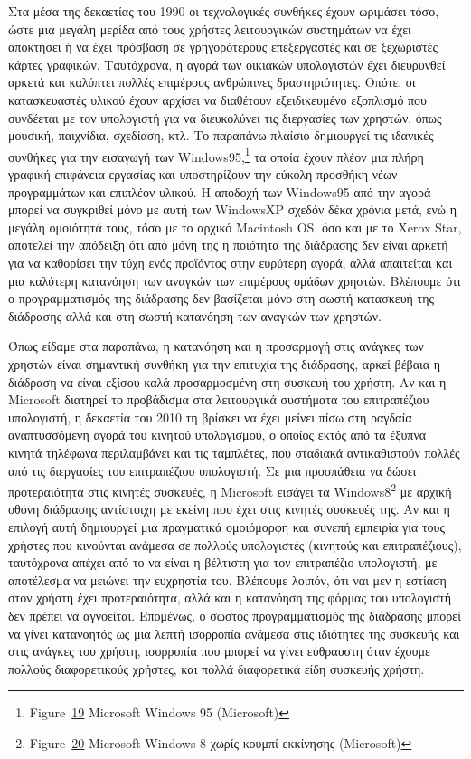 \documentclass[
]{article}
\begin{document}
Στα μέσα της δεκαετίας του 1990 οι τεχνολογικές συνθήκες έχουν ωριμάσει
τόσο, ώστε μια μεγάλη μερίδα από τους χρήστες λειτουργικών συστημάτων να
έχει αποκτήσει ή να έχει πρόσβαση σε γρηγορότερους επεξεργαστές και σε
ξεχωριστές κάρτες γραφικών. Ταυτόχρονα, η αγορά των οικιακών υπολογιστών
έχει διευρυνθεί αρκετά και καλύπτει πολλές επιμέρους ανθρώπινες
δραστηριότητες. Οπότε, οι κατασκευαστές υλικού έχουν αρχίσει να
διαθέτουν εξειδικευμένο εξοπλισμό που συνδέεται με τον υπολογιστή για να
διευκολύνει τις διεργασίες των χρηστών, όπως μουσική, παιχνίδια,
σχεδίαση, κτλ. Το παραπάνω πλαίσιο δημιουργεί τις ιδανικές συνθήκες για
την εισαγωγή των Windows95,\footnote{Figure~\protect\hyperlink{fig:windows95}{19}
  Microsoft Windows 95 (Microsoft)} τα οποία έχουν πλέον μια πλήρη
γραφική επιφάνεια εργασίας και υποστηρίζουν την εύκολη προσθήκη νέων
προγραμμάτων και επιπλέον υλικού. Η αποδοχή των Windows95 από την αγορά
μπορεί να συγκριθεί μόνο με αυτή των WindowsXP σχεδόν δέκα χρόνια μετά,
ενώ η μεγάλη ομοιότητά τους, τόσο με το αρχικό Macintosh OS, όσο και με
το Xerox Star, αποτελεί την απόδειξη ότι από μόνη της η ποιότητα της
διάδρασης δεν είναι αρκετή για να καθορίσει την τύχη ενός προϊόντος στην
ευρύτερη αγορά, αλλά απαιτείται και μια καλύτερη κατανόηση των αναγκών
των επιμέρους ομάδων χρηστών. Βλέπουμε ότι ο προγραμματισμός της
διάδρασης δεν βασίζεται μόνο στη σωστή κατασκευή της διάδρασης αλλά και
στη σωστή κατανόηση των αναγκών των χρηστών.

Όπως είδαμε στα παραπάνω, η κατανόηση και η προσαρμογή στις ανάγκες των
χρηστών είναι σημαντική συνθήκη για την επιτυχία της διάδρασης, αρκεί
βέβαια η διάδραση να είναι εξίσου καλά προσαρμοσμένη στη συσκευή του
χρήστη. Αν και η Microsoft διατηρεί το προβάδισμα στα λειτουργικά
συστήματα του επιτραπέζιου υπολογιστή, η δεκαετία του 2010 τη βρίσκει να
έχει μείνει πίσω στη ραγδαία αναπτυσσόμενη αγορά του κινητού
υπολογισμού, ο οποίος εκτός από τα έξυπνα κινητά τηλέφωνα περιλαμβάνει
και τις ταμπλέτες, που σταδιακά αντικαθιστούν πολλές από τις διεργασίες
του επιτραπέζιου υπολογιστή. Σε μια προσπάθεια να δώσει προτεραιότητα
στις κινητές συσκευές, η Microsoft εισάγει τα Windows8\footnote{Figure~\protect\hyperlink{fig:windows8}{20}
  Microsoft Windows 8 χωρίς κουμπί εκκίνησης (Microsoft)} με αρχική
οθόνη διάδρασης αντίστοιχη με εκείνη που έχει στις κινητές συσκευές της.
Αν και η επιλογή αυτή δημιουργεί μια πραγματικά ομοιόμορφη και συνεπή
εμπειρία για τους χρήστες που κινούνται ανάμεσα σε πολλούς υπολογιστές
(κινητούς και επιτραπέζιους), ταυτόχρονα απέχει από το να είναι η
βέλτιστη για τον επιτραπέζιο υπολογιστή, με αποτέλεσμα να μειώνει την
ευχρηστία του. Βλέπουμε λοιπόν, ότι ναι μεν η εστίαση στον χρήστη έχει
προτεραιότητα, αλλά και η κατανόηση της φόρμας του υπολογιστή δεν πρέπει
να αγνοείται. Επομένως, ο σωστός προγραμματισμός της διάδρασης μπορεί να
γίνει κατανοητός ως μια λεπτή ισορροπία ανάμεσα στις ιδιότητες της
συσκευής και στις ανάγκες του χρήστη, ισορροπία που μπορεί να γίνει
εύθραυστη όταν έχουμε πολλούς διαφορετικούς χρήστες, και πολλά
διαφορετικά είδη συσκευής χρήστη.
\end{document}
